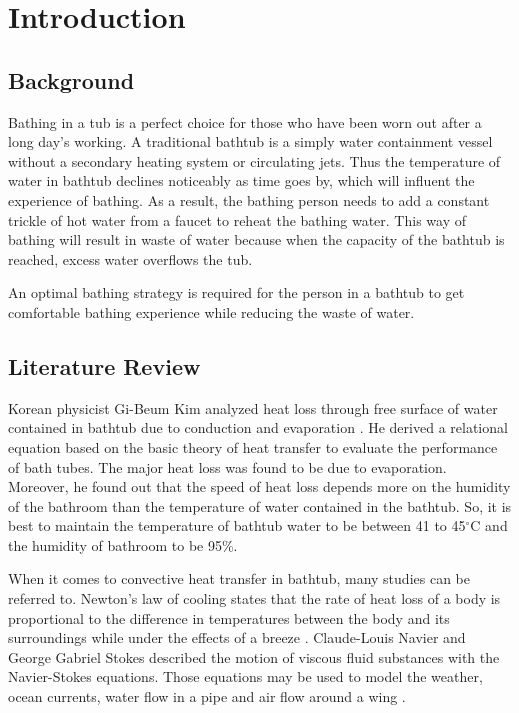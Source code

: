 \documentclass{mcmthesis}
\renewcommand{\contentsname}{\hspace*{\fill}\Large\bfseries Contents \hspace*{\fill}}
\begin{document}
\maketitle

\tableofcontents   %

\newpage


\section{Introduction}

\subsection{Background}

Bathing in a tub is a perfect choice for those who have been worn out after a long day's working. A traditional bathtub is a simply water containment vessel without a secondary heating system or circulating jets. Thus the temperature of water in bathtub declines noticeably as time goes by, which will influent the experience of bathing. As a result, the bathing person needs to add a constant trickle of hot water from a faucet to reheat the bathing water. This way of bathing will result in waste of water because when the capacity of the bathtub is reached, excess water overflows the tub.

An optimal bathing strategy is required for the person in a bathtub to get comfortable bathing experience while reducing the waste of water.

\subsection{Literature Review}

Korean physicist Gi-Beum Kim analyzed heat loss through free surface of water contained in bathtub due to conduction and evaporation \cite{1}. He derived a relational equation based on the basic theory of heat transfer to evaluate the performance of bath tubes. The major heat loss was found to be due to evaporation. Moreover, he found out that the speed of heat loss depends more on the humidity of the bathroom than the temperature of water contained in the bathtub. So, it is best to maintain the temperature of bathtub water to be between 41 to 45$^{\circ}$C and the humidity of bathroom to be 95\%.

When it comes to convective heat transfer in bathtub, many studies can be referred to. Newton's law of cooling states that the rate of heat loss of a body is proportional to the difference in temperatures between the body and its surroundings while under the effects of a breeze \cite{2}. Claude-Louis Navier and George Gabriel Stokes described the motion of viscous fluid substances with the Navier-Stokes equations. Those equations may be used to model the weather, ocean currents, water flow in a pipe and air flow around a wing \cite{3}.
\end{document}

